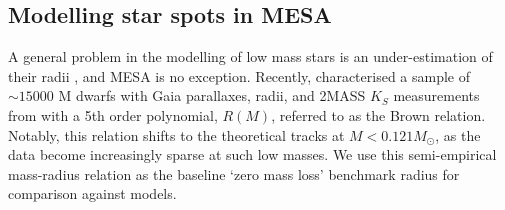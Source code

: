 \subsection{Modelling star spots in MESA}
\label{sect:modelling:starspots in MESA}

A general problem in the modelling of low mass stars is an under-estimation of their radii \citep{lopez2005}, and MESA is no exception.
Recently, \citet{brown2022} characterised a sample of $\sim 15000$ M dwarfs with Gaia parallaxes, radii, and 2MASS $K_S$ measurements from \citet{morrell2019} with a 5th order polynomial, $R(M)$, referred to as the Brown relation. Notably, this relation shifts to the theoretical \citet{baraffe2015} tracks at $M < 0.121 M_\odot$, as the data become increasingly sparse at such low masses.
We use this semi-empirical mass-radius relation as the baseline `zero mass loss' benchmark radius for comparison against models.

